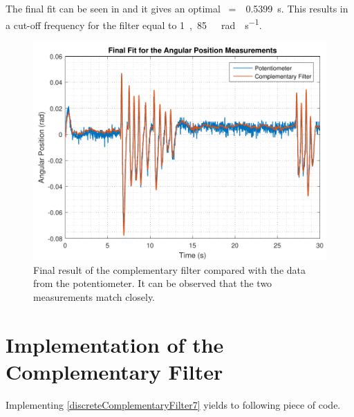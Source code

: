 The final fit can be seen in  and it gives an optimal \si{\tau=\ }\SI{0,5399}{s}. This results in a cut-off frequency for the filter equal to \si{1,85\ rad \cdot s^{-1}}.
%
\begin{figure}[H]
	\centering
	\includegraphics[scale=0.60]{figures/filterSensTool}
	\caption{Final result of the complementary filter compared with the data from the potentiometer. It can be observed that the two measurements match closely.}
	\label{filterSensTool}
\end{figure}\vspace{-5mm}
%

\section{Implementation of the Complementary Filter}
Implementing \eqref{discreteComplementaryFilter7} yields to following piece of code. 

